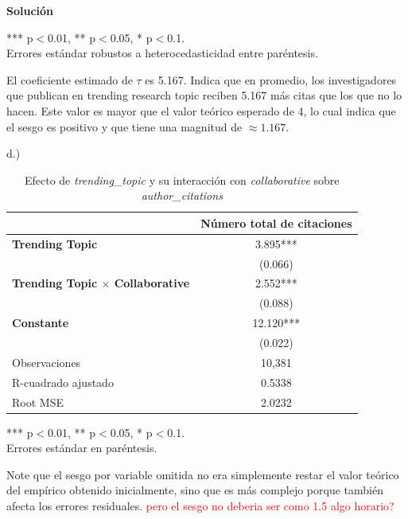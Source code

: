 \documentclass[a4paper, answers, addpoints, 11pt]{exam}
\newenvironment{solucion}{%
  \begin{mdframed}[
    backgroundcolor=blue!5,    %
    linecolor=blue!50,          %
    linewidth=2pt,              %
    leftmargin=10pt,            %
    rightmargin=10pt,           %
    topline=true,              %
    bottomline=true,            %
    roundcorner=10pt,           %
    innerleftmargin=10pt,       %
    innerrightmargin=10pt,      %
    innerbottommargin=10pt,     %
    innertopmargin=10pt         %
  ]%
  \begin{tcolorbox}[colframe=blue!50!black, colback=blue!50, coltitle=white, sharp corners=all, boxrule=1mm, width=\textwidth, halign=left, valign=center, top=0mm, bottom=0mm, left=0mm, right=0mm] \textbf{Solución} \end{tcolorbox} }{\end{mdframed}}
\begin{document}
\begin{itemize}
\begin{solucion}
\begin{table}[H]
    \vspace{0.3cm}
    \footnotesize{*** p$<$0.01, ** p$<$0.05, * p$<$0.1. \\
    Errores estándar robustos a heterocedasticidad entre paréntesis.}
\end{table}

El coeficiente estimado de $\tau$ es 5.167. Indica que en promedio, los investigadores que publican en trending research topic reciben 5.167 más citas que los que no lo hacen. Este valor es  mayor que el valor teórico esperado de 4, lo cual indica que el sesgo es positivo y que tiene una magnitud de $\approx 1.167$.

        d.)
        \begin{table}[H]
    \centering
    \caption{Efecto de \textit{trending\_topic} y su interacción con \textit{collaborative} sobre \textit{author\_citations}}
    \label{tab:resultados}
    \begin{tabular}{l c}
        \toprule
        & Número total de citaciones \\
        \midrule
        \textbf{Trending Topic} & 3.895*** \\
        & (0.066) \\
        \textbf{Trending Topic $\times$ Collaborative} & 2.552*** \\
        & (0.088) \\
        \textbf{Constante} & 12.120*** \\
        & (0.022) \\
        \midrule
        Observaciones & 10,381 \\
        R-cuadrado ajustado & 0.5338 \\
        Root MSE & 2.0232 \\
        \bottomrule
    \end{tabular}
    
    \vspace{0.3cm}
    \footnotesize{*** p$<$0.01, ** p$<$0.05, * p$<$0.1. \\
    Errores estándar en paréntesis.}
\end{table}
Note que el sesgo por variable omitida no era simplemente restar el valor teórico del empírico obtenido inicialmente, sino que es más complejo porque también afecta los errores residuales.
\textcolor{red}{pero el sesgo no deberia ser como 1.5 algo horario?}

        \end{solucion}
    

\end{itemize}
\bigskip
\end{document}
